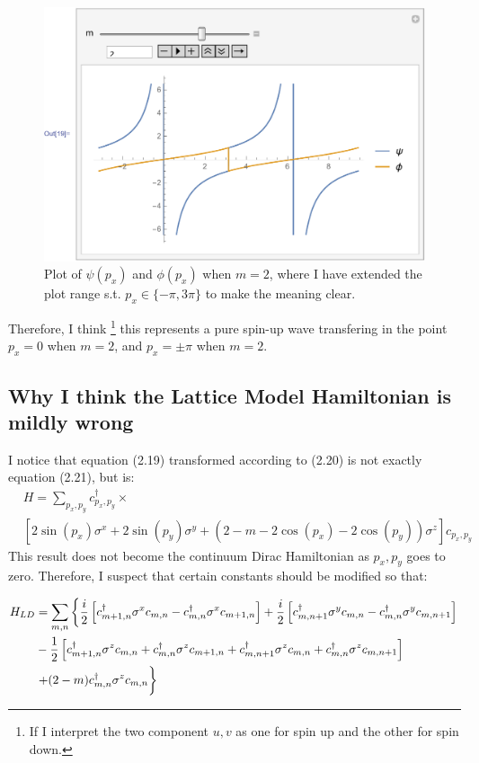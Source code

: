 \documentclass{article}
\begin{document}
\begin{figure}[H]
    \centering
    \includegraphics[width=0.6\linewidth]{pics/upperSpinWaveM2.pdf}
    \caption{Plot of $\psi(p_x)$ and $\phi(p_x)$ when $m=2$, where I
    have extended the plot range s.t. $p_x\in\{-\pi,3\pi\}$ to make the
    meaning clear.}
\end{figure}

Therefore, I think
\footnote{If I interpret the two component $u,v$ as one for spin up
and the other for spin down.} 
this represents a pure spin-up wave transfering in the point $p_x=0$
when $m=2$, and $p_x=\pm\pi$ when $m=2$.


    \subsection{Why I think the Lattice Model Hamiltonian is mildly wrong}
    \label{sec:Why-LatticeM-m-wrong}

    I notice that equation (2.19) transformed according to (2.20)
    is not exactly equation (2.21), but is:
    \begin{align}
        &H =\sum_{p_x,p_y} c^\dagger_{p_x,p_y}\times
        \nonumber\\
        &
        \left[
            2\sin(p_x)\sigma^x + 2\sin(p_y)\sigma^y
            +(2-m-2\cos(p_x)-2\cos(p_y))\sigma^z
        \right] c_{p_x,p_y}
    \end{align}
    This result does not become the continuum Dirac Hamiltonian as
    $p_x,p_y$ goes to zero. Therefore, I suspect that certain
    constants should be modified so that:

    \begin{align}
        H_{LD} &= \sum_{m,n}\left\{
            \frac{i}{2} \left[ c^\dagger_{m+1,n}\sigma^x c_{m,n}
                - c^\dagger_{m,n}\sigma^x c_{m+1,n}\right]
            + \frac{i}{2} \left[ c^\dagger_{m,n+1}\sigma^y c_{m,n}
                - c^\dagger_{m,n}\sigma^y c_{m,n+1} \right]
            \right.
            \nonumber\\
            &- \frac{1}{2}\left[
                c^\dagger_{m+1,n}\sigma^z c_{m,n}
                + c^\dagger_{m,n}\sigma^z c_{m+1,n}
                + c^\dagger_{m,n+1}\sigma^z c_{m,n}
                + c^\dagger_{m,n}\sigma^z c_{m,n+1}
            \right]
            \nonumber\\
            & \left. + (2-m) c^\dagger_{m,n}\sigma^z c_{m,n}
            \vphantom{\frac12}
        \right\}
    \end{align}
\end{document}
